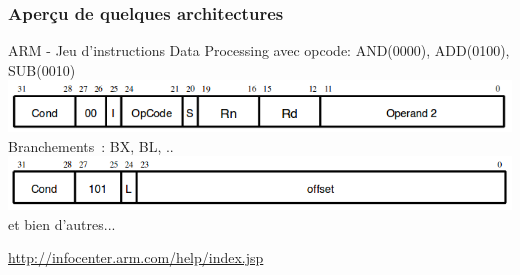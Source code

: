 \documentclass{beamer}
\begin{document}
\begin{frame}
  \frametitle{Aperçu de quelques architectures}
  \begin{block}{ARM - Jeu d'instructions}
    Data Processing avec opcode: AND(0000), ADD(0100), SUB(0010)\\
    \includegraphics[width=0.8\columnwidth]{Figs/arm_dataprocessing.png}\\
    Branchements~: BX, BL, ..\\
    \includegraphics[width=0.8\columnwidth]{Figs/arm_branch.png}\\
    et bien d'autres...
  \end{block}
  \url{http://infocenter.arm.com/help/index.jsp}
\end{frame}
\end{document}

